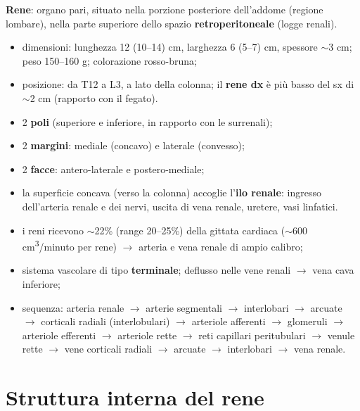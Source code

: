 \textbf{Rene}: organo pari, situato nella porzione posteriore dell'addome (regione lombare), nella
parte superiore dello spazio \textbf{retroperitoneale} (logge renali).
\begin{itemize}
  \item dimensioni: lunghezza 12 (10--14) cm, larghezza 6 (5--7) cm, spessore $\sim$3 cm; peso
    150--160 g; colorazione rosso-bruna;
  \item posizione: da T12 a L3, a lato della colonna; il \textbf{rene dx} è più basso del sx di
    $\sim$2 cm (rapporto con il fegato).
\end{itemize}

\begin{itemize}
  \item 2 \textbf{poli} (superiore e inferiore, in rapporto con le surrenali);
  \item 2 \textbf{margini}: mediale (concavo) e laterale (convesso);
  \item 2 \textbf{facce}: antero-laterale e postero-mediale;
  \item la superficie concava (verso la colonna) accoglie l'\textbf{ilo renale}: ingresso
    dell'arteria renale e dei nervi, uscita di vena renale, uretere, vasi linfatici.
\end{itemize}

\begin{itemize}
  \item i reni ricevono $\sim$22\% (range 20--25\%) della gittata cardiaca ($\sim$600
    cm\textsuperscript{3}/minuto per rene) $\rightarrow$ arteria e vena renale di ampio calibro;
  \item sistema vascolare di tipo \textbf{terminale}; deflusso nelle vene renali $\rightarrow$ vena
    cava inferiore;
  \item sequenza: arteria renale $\rightarrow$ arterie segmentali $\rightarrow$ interlobari
    $\rightarrow$ arcuate $\rightarrow$ corticali radiali (interlobulari) $\rightarrow$ arteriole
    afferenti $\rightarrow$ glomeruli $\rightarrow$ arteriole efferenti $\rightarrow$ arteriole rette
    $\rightarrow$ reti capillari peritubulari $\rightarrow$ venule rette $\rightarrow$ vene corticali
    radiali $\rightarrow$ arcuate $\rightarrow$ interlobari $\rightarrow$ vena renale.
\end{itemize}

\section{Struttura interna del rene}

